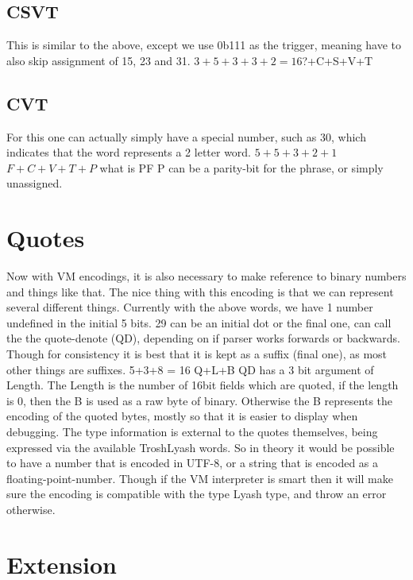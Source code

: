 \subsection{CSVT}\label{csvt}

This is similar to the above, except we use 0b111 as the trigger,
meaning have to also skip assignment of 15, 23 and 31.
$3+5+3+3+2=16$?+C+S+V+T

\subsection{CVT}\label{cvt}

For this one can actually simply have a special number, such as 30,
which indicates that the word represents a 2 letter word. $5+5+3+2+1$
$F+C+V+T+P$ what is PF P can be a parity-bit for the phrase, or simply
unassigned.

\section{Quotes}\label{quotes}

Now with VM encodings, it is also necessary to make reference to binary
numbers and things like that. The nice thing with this encoding is that
we can represent several different things. Currently with the above
words, we have 1 number undefined in the initial 5 bits. 29 can be an
initial dot or the final one, can call the the quote-denote (QD),
depending on if parser works forwards or backwards. Though for
consistency it is best that it is kept as a suffix (final one), as most
other things are suffixes. 5+3+8 = 16 Q+L+B QD has a 3 bit argument of
Length. The Length is the number of 16bit fields which are quoted, if
the length is 0, then the B is used as a raw byte of binary. Otherwise
the B represents the encoding of the quoted bytes, mostly so that it is
easier to display when debugging. The type information is external to
the quotes themselves, being expressed via the available TroshLyash
words. So in theory it would be possible to have a number that is
encoded in UTF-8, or a string that is encoded as a
floating-point-number. Though if the VM interpreter is smart then it
will make sure the encoding is compatible with the type Lyash type, and
throw an error otherwise.

\section{Extension}\label{extension}

